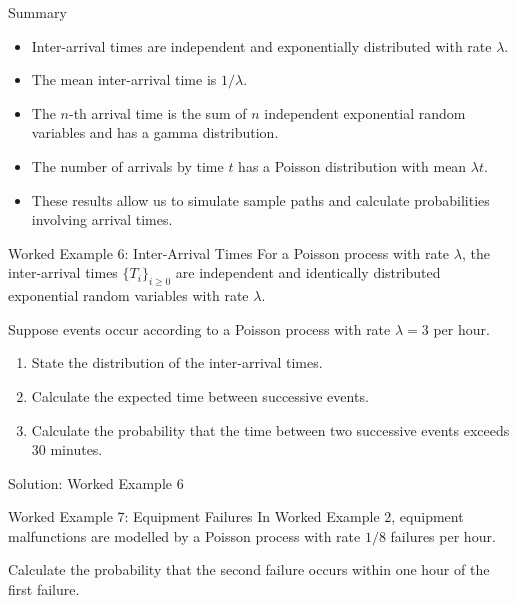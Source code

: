 \documentclass[
  ignorenonframetext,
  aspectratio=169,
]{beamer}
\providecommand{\tightlist}{%
  \setlength{\itemsep}{0pt}\setlength{\parskip}{0pt}}
\begin{document}
\begin{frame}{Summary}
\protect{}\label{summary}
\begin{itemize}
\tightlist
\item
  Inter-arrival times are independent and exponentially distributed with
  rate \(\lambda\).
\item
  The mean inter-arrival time is \(1/\lambda\).
\item
  The \(n\)-th arrival time is the sum of \(n\) independent exponential
  random variables and has a gamma distribution.
\item
  The number of arrivals by time \(t\) has a Poisson distribution with
  mean \(\lambda t\).
\item
  These results allow us to simulate sample paths and calculate
  probabilities involving arrival times.
\end{itemize}
\end{frame}

\begin{frame}{Worked Example 6: Inter-Arrival Times}
\protect{}\label{worked-example-6-inter-arrival-times}
For a Poisson process with rate \(\lambda\), the inter-arrival times
\(\{T_i\}_{i\geq 0}\) are independent and identically distributed
exponential random variables with rate \(\lambda\).

Suppose events occur according to a Poisson process with rate
\(\lambda=3\) per hour.

\begin{enumerate}
\tightlist
\item
  State the distribution of the inter-arrival times.
\item
  Calculate the expected time between successive events.
\item
  Calculate the probability that the time between two successive events
  exceeds 30 minutes.
\end{enumerate}
\end{frame}

\begin{frame}{Solution: Worked Example 6}
\protect{}\label{solution-worked-example-6}
\end{frame}

\begin{frame}{Worked Example 7: Equipment Failures}
\protect{}\label{worked-example-7-equipment-failures}
In Worked Example 2, equipment malfunctions are modelled by a Poisson
process with rate \(1/8\) failures per hour.

Calculate the probability that the second failure occurs within one hour
of the first failure.
\end{frame}
\end{document}

